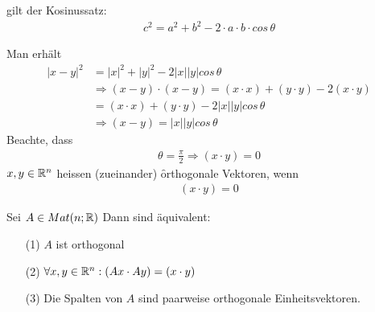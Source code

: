 \begin{center}
\end{center}
gilt der Kosinussatz:
\begin{align}
c^2 = a^2 + b^2 - 2 \cdot a \cdot b \cdot cos\, \theta
\end{align}

\begin{center}
\end{center}
Man erhält
\begin{align}
|x-y|^2 &= |x|^2 + |y|^2 - 2 |x| |y| cos\, \theta \\
&\Rightarrow (x-y)\cdot (x-y) = (x\cdot x) + (y \cdot y) - 2(x \cdot y) \\
&= (x \cdot x) + (y \cdot y) -2 |x| |y| cos\, \theta \\
&\Rightarrow (x-y) = |x| |y| cos\, \theta
\end{align}
Beachte, dass
\begin{align}
\theta = \frac{\pi}{2} \Rightarrow (x \cdot y) = 0
\end{align}
$x, y \in \mathbb{R}^n$ heissen (zueinander) \f{orthogonale} Vektoren, wenn
\begin{align}
(x \cdot y) = 0
\end{align}

\begin{satz} %
\label{satz311}
Sei $A \in Mat(n; \mathbb{R})$ Dann sind äquivalent:
\begin{itemize}
\item[(1)] $A$ ist orthogonal
\item[(2)] $\forall x, y \in \mathbb{R}^n: (Ax \cdot Ay) = (x \cdot y)$
\item[(3)] Die Spalten von $A$ sind paarweise orthogonale Einheitsvektoren.
\end{itemize}
\end{satz}

